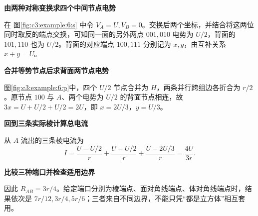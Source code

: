 \begin{solution}\textbf{由两种对称变换求四个中间节点电势}\par\nobreak
在 图\ref{fig:c3:example:6:s} 中令 $V_A=U,V_B=0$。交换后两个坐标，并结合将这两位同时取反的端点交换，可知同一面的另外两点 $001,010$ 电势为 $U/2$，背面的 $101,110$ 也为 $U/2$。背面的对应端点 $100,111$ 分别记为 $x,y$，由互补关系 $x+y=U$。



\par\medskip{}\noindent\textbf{合并等势节点后求背面两节点电势}\par\nobreak
图\ref{fig:c3:example:6:p}中，四个 $U/2$ 节点合并为 $H$，两条并行跨组边各折合为 $r/2$。原节点 $100$ 与 $A$、两个电势为 $U/2$ 的背面节点相连，故 $3x=U+U/2+U/2=2U$，即 $x=2U/3$，$y=U/3$。

\par\medskip{}\noindent\textbf{回到三条实际棱计算总电流}\par\nobreak
从 $A$ 流出的三条棱电流为
\[
 I=\frac{U-U/2}{r}+\frac{U-U/2}{r}+\frac{U-2U/3}{r}
 =\frac{4U}{3r}.
\]


\par\medskip{}\noindent\textbf{比较三种端口并检查适用边界}\par\nobreak
因此 $R_{AB}=3r/4$。给定端口分别为棱端点、面对角线端点、体对角线端点时，结果依次是 $7r/12,3r/4,5r/6$；三者来自不同边界，不能只凭“都是立方体”相互套用。\end{solution}
